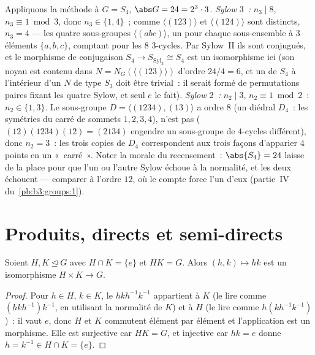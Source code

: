 \begin{example}
\label{ex:b3:groups:s4sylow}
Appliquons la méthode à $G = S_4$, $\abs G = 24 = 2^3\cdot3$.
\emph{Sylow $3$~:} $n_3 \mid 8$, $n_3 \equiv 1 \bmod 3$, donc $n_3
\in \{1, 4\}$~; comme $\langle(123)\rangle$ et
$\langle(124)\rangle$ sont distincts, $n_3 = 4$ --- les quatre
sous-groupes $\langle(abc)\rangle$, un pour chaque sous-ensemble
à $3$ éléments $\{a, b, c\}$, comptant pour les $8$
$3$-cycles. Par Sylow~II ils sont conjugués, et le morphisme de
conjugaison $S_4 \to S_{\mathrm{Syl}_3} \cong S_4$ est un
isomorphisme ici (son noyau est contenu dans $N =
N_G(\langle(123)\rangle)$ d'ordre $24/4 = 6$, et un  de $S_4$ à l'intérieur d'un $N$ de type $S_3$ doit être
trivial~: il serait formé de permutations paires fixant les quatre
Sylow, et seul $e$ le fait). \emph{Sylow $2$~:} $n_2 \mid 3$, $n_2
\equiv 1 \bmod 2$~: $n_2 \in \{1, 3\}$. Le sous-groupe $D =
\langle(1234), (13)\rangle$ a ordre $8$ (un diédral $D_4$~: les
symétries du carré de sommets $1, 2, 3, 4$), n'est pas 
($(12)(1234)(12) = (2134)$ engendre un sous-groupe de $4$-cycles
différent), donc $n_2 = 3$~: les trois copies de $D_4$
correspondent aux trois façons d'apparier $4$ points en un
«~carré~». Noter la morale du recensement~: $\abs{S_4} = 24$
laisse de la place pour que l'un ou l'autre Sylow échoue à la
normalité, et les deux échouent --- comparer à l'ordre $12$, où
le compte force l'un d'eux  (partie~IV
du~\cref{pb:b3:groups:1}).
\end{example}

\section{Produits, directs et semi-directs}

\begin{proposition}\label{prop:b3:groups:direct}
Soient $H, K \trianglelefteq G$ avec $H \cap K = \{e\}$ et $HK =
G$. Alors $(h,k) \mapsto hk$ est un isomorphisme $H \times K \to
G$.
\end{proposition}

\begin{proof}
Pour $h \in H$, $k \in K$, le  $hkh^{-1}k^{-1}$
appartient à $K$ (le lire comme $(hkh^{-1})k^{-1}$, en utilisant
la normalité de $K$) et à $H$ (le lire comme $h(kh^{-1}k^{-1})$)~:
il vaut $e$, donc $H$ et $K$ commutent élément par élément et
l'application est un morphisme. Elle est surjective car $HK = G$,
et injective car $hk = e$ donne $h = k^{-1} \in H \cap K =
\{e\}$.
\end{proof}

